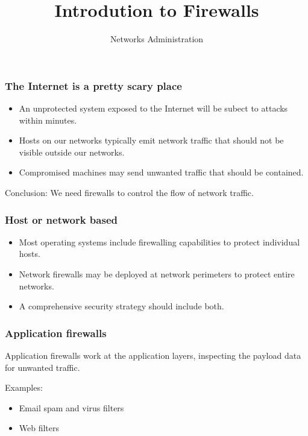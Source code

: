 \documentclass[10pt]{beamer}
\title{Introdution to Firewalls}
\author[IN715]{Networks Administration}
\institute[Otago Polytechnic]{
  Otago Polytechnic \\
  Dunedin, New Zealand \\
}
\date{}
\begin{document}
\begin{frame}[plain]
  \titlepage
\end{frame}


\begin{frame}
  \frametitle{The Internet is a pretty scary place}

 \begin{itemize}
  \item An unprotected system exposed to the Internet will be subect to attacks within minutes.
  \item Hosts on our networks typically emit network traffic that should not be visible outside 
	  our networks.
  \item Compromised machines may send unwanted traffic that should be contained.
 \end{itemize}
 
 Conclusion:  We need firewalls to control the flow of network traffic.
\end{frame}


\begin{frame}
  \frametitle{Host or network based}

 \begin{itemize}
	 \item Most operating systems include firewalling capabilities to protect individual hosts.
	 \item Network firewalls may be deployed at network perimeters to protect entire networks.
	 \item A comprehensive security strategy should include both.
 \end{itemize}

\end{frame}


\begin{frame}
  \frametitle{Application firewalls}

 Application firewalls work at the application layers, inspecting the payload data
 for unwanted traffic.

 Examples:
 \begin{itemize}
	 \item Email spam and virus filters
	 \item Web filters
 \end{itemize}

\end{frame}
\end{document}
